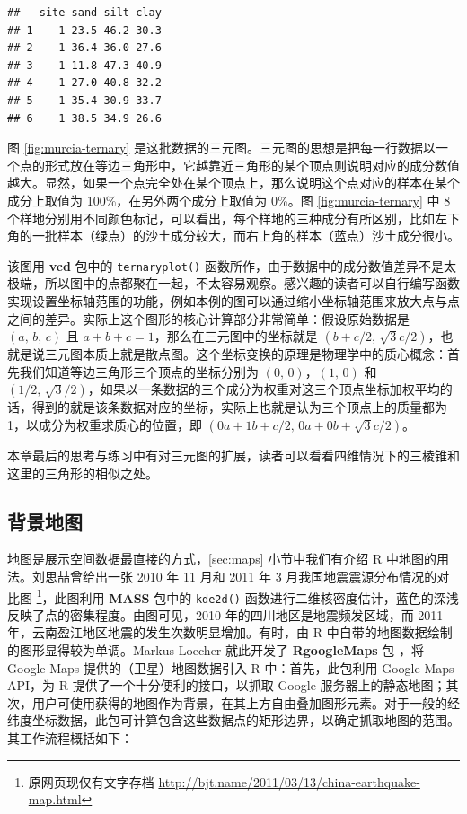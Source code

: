 \documentclass[
  b5paper,
  UTF8,twoside]{book}
\begin{document}
\begin{verbatim}
##   site sand silt clay
## 1    1 23.5 46.2 30.3
## 2    1 36.4 36.0 27.6
## 3    1 11.8 47.3 40.9
## 4    1 27.0 40.8 32.2
## 5    1 35.4 30.9 33.7
## 6    1 38.5 34.9 26.6
\end{verbatim}

图 \ref{fig:murcia-ternary} 是这批数据的三元图。三元图的思想是把每一行数据以一个点的形式放在等边三角形中，它越靠近三角形的某个顶点则说明对应的成分数值越大。显然，如果一个点完全处在某个顶点上，那么说明这个点对应的样本在某个成分上取值为 100\%，在另外两个成分上取值为 0\%。图 \ref{fig:murcia-ternary} 中 8 个样地分别用不同颜色标记，可以看出，每个样地的三种成分有所区别，比如左下角的一批样本（绿点）的沙土成分较大，而右上角的样本（蓝点）沙土成分很小。

该图用 \textbf{vcd} 包中的 \texttt{ternaryplot()} 函数所作，由于数据中的成分数值差异不是太极端，所以图中的点都聚在一起，不太容易观察。感兴趣的读者可以自行编写函数实现设置坐标轴范围的功能，例如本例的图可以通过缩小坐标轴范围来放大点与点之间的差异。实际上这个图形的核心计算部分非常简单：假设原始数据是 \((a,\,b,\,c)\) 且 \(a+b+c=1\)，那么在三元图中的坐标就是 \((b+c/2,\,\sqrt{3}c/2)\)，也就是说三元图本质上就是散点图。这个坐标变换的原理是物理学中的质心概念：首先我们知道等边三角形三个顶点的坐标分别为 \((0,\,0)\)，\((1,\,0)\) 和 \((1/2,\,\sqrt{3}/2)\)，如果以一条数据的三个成分为权重对这三个顶点坐标加权平均的话，得到的就是该条数据对应的坐标，实际上也就是认为三个顶点上的质量都为 1，以成分为权重求质心的位置，即 \((0a+1b+c/2,\,0a+0b+\sqrt{3}c/2)\)。

本章最后的思考与练习中有对三元图的扩展，读者可以看看四维情况下的三棱锥和这里的三角形的相似之处。

\subsection{背景地图}\label{ux80ccux666fux5730ux56fe}

地图是展示空间数据最直接的方式，\ref{sec:maps} 小节中我们有介绍 R 中地图的用法。刘思喆曾给出一张 2010 年 11 月和 2011 年 3 月我国地震震源分布情况的对比图 \footnote{原网页现仅有文字存档 \url{http://bjt.name/2011/03/13/china-earthquake-map.html}}，此图利用 \textbf{MASS} 包中的 \texttt{kde2d()} 函数进行二维核密度估计，蓝色的深浅反映了点的密集程度。由图可见，2010 年的四川地区是地震频发区域，而 2011 年，云南盈江地区地震的发生次数明显增加。有时，由 R 中自带的地图数据绘制的图形显得较为单调。Markus Loecher 就此开发了 \textbf{RgoogleMaps} 包 \citep{RgoogleMaps}，将 Google Maps 提供的（卫星）地图数据引入 R 中：首先，此包利用 Google Maps API，为 R 提供了一个十分便利的接口，以抓取 Google 服务器上的静态地图；其次，用户可使用获得的地图作为背景，在其上方自由叠加图形元素。对于一般的经纬度坐标数据，此包可计算包含这些数据点的矩形边界，以确定抓取地图的范围。其工作流程概括如下：
\end{document}
